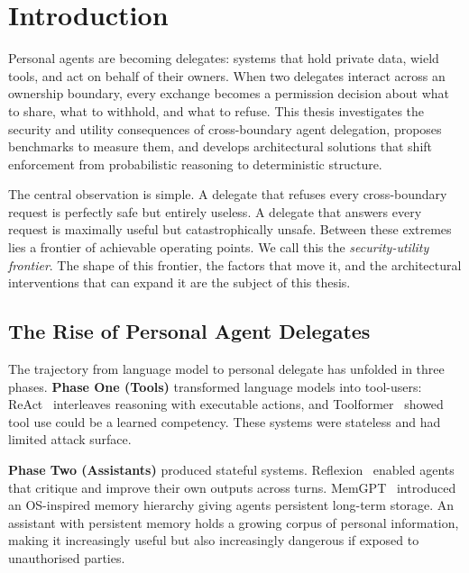\chapter{Introduction}
\label{chapter:introduction}

Personal agents are becoming delegates: systems that hold private data, wield tools, and act on behalf of their owners. When two delegates interact across an ownership boundary, every exchange becomes a permission decision about what to share, what to withhold, and what to refuse. This thesis investigates the security and utility consequences of cross-boundary agent delegation, proposes benchmarks to measure them, and develops architectural solutions that shift enforcement from probabilistic reasoning to deterministic structure.

The central observation is simple. A delegate that refuses every cross-boundary request is perfectly safe but entirely useless. A delegate that answers every request is maximally useful but catastrophically unsafe. Between these extremes lies a frontier of achievable operating points. We call this the \textit{security-utility frontier}. The shape of this frontier, the factors that move it, and the architectural interventions that can expand it are the subject of this thesis.


\section{The Rise of Personal Agent Delegates}
\label{sec:intro_rise}

The trajectory from language model to personal delegate has unfolded in three phases. \textbf{Phase One (Tools)} transformed language models into tool-users: ReAct~\cite{yao2023react} interleaves reasoning with executable actions, and Toolformer~\cite{schick2023toolformer} showed tool use could be a learned competency. These systems were stateless and had limited attack surface.

\textbf{Phase Two (Assistants)} produced stateful systems. Reflexion~\cite{shinn2023reflexion} enabled agents that critique and improve their own outputs across turns. MemGPT~\cite{packer2024memgpt} introduced an OS-inspired memory hierarchy giving agents persistent long-term storage. An assistant with persistent memory holds a growing corpus of personal information, making it increasingly useful but also increasingly dangerous if exposed to unauthorised parties.

